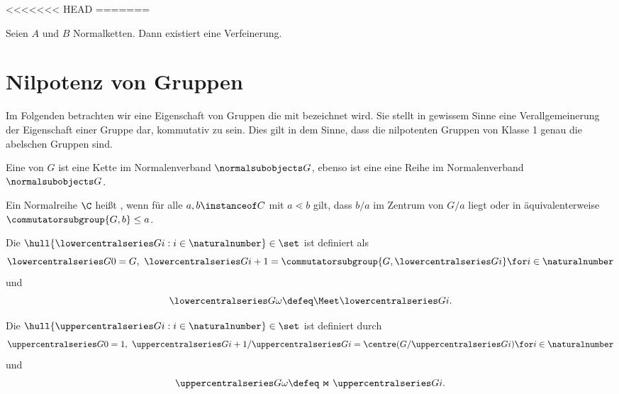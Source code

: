 <<<<<<< HEAD
=======
\begin{theorem}
    Seien $A$ und $B$ Normalketten. Dann existiert eine Verfeinerung.
\end{theorem}

\begin{theorem} 
    
\end{theorem}

\section{Nilpotenz von Gruppen}

Im Folgenden betrachten wir eine Eigenschaft von Gruppen die mit
 bezeichnet wird. Sie stellt in gewissem Sinne
eine Verallgemeinerung der Eigenschaft einer Gruppe dar, kommutativ zu sein. Dies gilt in dem Sinne, dass die nilpotenten Gruppen
von Klasse 1 genau die abelschen Gruppen sind.

\begin{definition}
    Eine  von $G$ ist eine Kette im Normalenverband
    $\normalsubobjects G$, ebenso ist eine  eine Reihe im Normalenverband
    $\normalsubobjects G$.
\end{definition}

\begin{definition}[Zentralkette]
    Ein Normalreihe $\C$ heißt , wenn für alle
    $a,b\instanceof C$ mit $a\lessdot b$ gilt, dass $b/a$ im Zentrum
    von $G/a$ liegt oder in äquivalenterweise $\commutatorsubgroup {G, b} \leq a$.
\end{definition}

\begin{definition}
    Die  $\hull{\lowercentralseries G i:i\in\naturalnumber}\in\set$ ist definiert als
    $$
    \lowercentralseries G 0 = G,\ \lowercentralseries G {i+1} = \commutatorsubgroup {G,\lowercentralseries G i} \for i\in\naturalnumber   
    $$
    und
    $$
    \lowercentralseries G \omega \defeq \Meet \lowercentralseries G i.
    $$
\end{definition}

\begin{definition}
    Die  $\hull{\uppercentralseries G i:i\in\naturalnumber}\in\set$ ist definiert durch
    $$
    \uppercentralseries G 0 = 1,\ \uppercentralseries G {i+1}/\uppercentralseries G i = \centre (G/\uppercentralseries G i) \for
    i\in\naturalnumber
    $$
    und
    $$
    \uppercentralseries G \omega \defeq \Join \uppercentralseries G i.
    $$
\end{definition}

